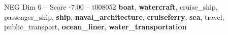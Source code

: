 \begin{textsample}{NEG Dim 6 – Score -7.00 – t008052}  \label{ex:f6_neg_025}
\textbf{boat}, \textbf{watercraft}, cruise\_ship, passenger\_ship, \textbf{ship}, \textbf{naval\_architecture}, \textbf{cruiseferry}, \textbf{sea}, travel, public\_transport, \textbf{ocean\_liner}, \textbf{water\_transportation}

\end{textsample}
